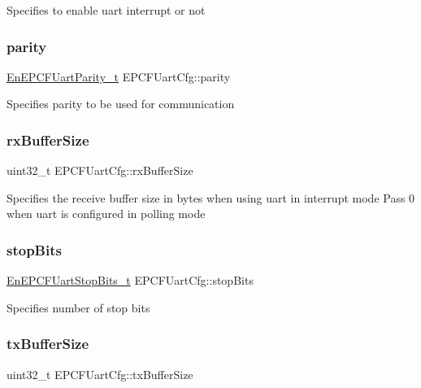 Specifies to enable uart interrupt or not \mbox{\label{structEPCFUartCfg_a9bca630da923c86a472569120bcaf0c0}} 
\subsubsection{\texorpdfstring{parity}{parity}}
{\footnotesize\ttfamily \mbox{\hyperlink{uart_8h_ae3b1989d517831580e94d943b5701848}{En\+E\+P\+C\+F\+Uart\+Parity\+\_\+t}} E\+P\+C\+F\+Uart\+Cfg\+::parity}

Specifies parity to be used for communication \mbox{\label{structEPCFUartCfg_a18b2a5f72dcf93e14987a0dc5d9c74b1}} 
\subsubsection{\texorpdfstring{rx\+Buffer\+Size}{rxBufferSize}}
{\footnotesize\ttfamily uint32\+\_\+t E\+P\+C\+F\+Uart\+Cfg\+::rx\+Buffer\+Size}

Specifies the receive buffer size in bytes when using uart in interrupt mode Pass 0 when uart is configured in polling mode \mbox{\label{structEPCFUartCfg_a73d09fb0d0a1c9bed2168744e0f395f1}} 
\subsubsection{\texorpdfstring{stop\+Bits}{stopBits}}
{\footnotesize\ttfamily \mbox{\hyperlink{uart_8h_a1d89bd0bb4e330d2d1d8b0229ecbcb35}{En\+E\+P\+C\+F\+Uart\+Stop\+Bits\+\_\+t}} E\+P\+C\+F\+Uart\+Cfg\+::stop\+Bits}

Specifies number of stop bits \mbox{\label{structEPCFUartCfg_adc64f8ba1a6f531727518641fd220737}} 
\subsubsection{\texorpdfstring{tx\+Buffer\+Size}{txBufferSize}}
{\footnotesize\ttfamily uint32\+\_\+t E\+P\+C\+F\+Uart\+Cfg\+::tx\+Buffer\+Size}

